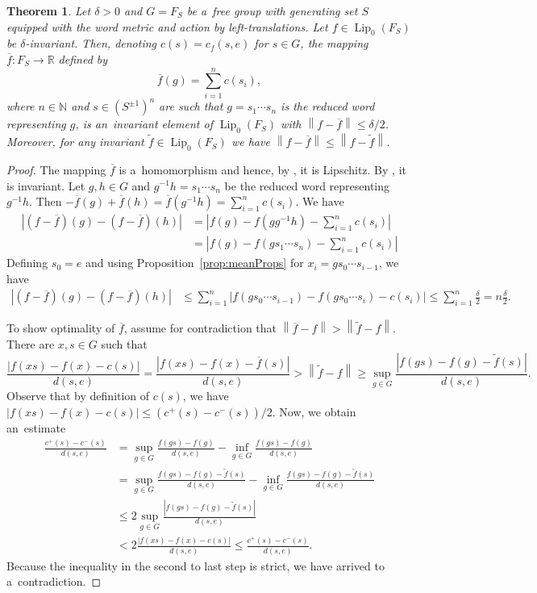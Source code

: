 \documentclass[11pt,a4paper]{amsart}
\newtheorem{theorem}{Theorem}[section]
\theoremstyle{definition}
\newcommand{\R}{\mathbb{R}}
\newcommand{\N}{\mathbb{N}}
\newcommand{\fTilde}{\widetilde{f}}
\newcommand{\fBar}{\overline{f}}
\newcommand{\abs}[1]{\left| #1 \right|}
\newcommand{\norm}[1]{\left\| #1 \right\|}
\newcommand{\Lipz}{\operatorname{Lip}_0}
\begin{document}
	\begin{theorem} \label{thm:KYDfreeWord}
		Let $\delta > 0$ and $G = F_S$ be a~free group with generating set $S$ equipped with the word metric and action by left-translations. Let $f \in \Lipz(F_S)$ be $\delta$-invariant. Then, denoting $c(s) = c_f(s, e)$ for $s \in G$, the mapping $\fBar: F_S \to \R$ defined by
		\begin{equation*}
			\fBar(g) = \sum_{i=1}^n c(s_i),
		\end{equation*}
		where $n \in \N$ and $s \in (S^{\pm1})^n$ are such that $g = s_1 \cdots s_n$ is the reduced word representing $g$, is an~invariant element of $\Lipz(F_S)$ with $\norm{f - \fBar} \leq \delta/2$. Moreover, for any invariant $\fTilde \in \Lipz(F_S)$ we have $\norm{f-\fBar} \leq \norm{f-\fTilde}$.
	\end{theorem}
	\begin{proof}
		The mapping $\fBar$ is a~homomorphism and hence, by , it is Lipschitz. By , it is invariant. Let $g, h \in G$ and $g^{-1}h = s_1\cdots s_n$ be the reduced word representing $g^{-1}h$. Then $-\fBar(g) + \fBar(h) = \fBar(g^{-1}h) = \sum_{i=1}^n c(s_i)$. We have
		\begin{align*}
			\abs{(f-\fBar)(g) - (f-\fBar)(h)}
			&= \abs{f(g) - f(gg^{-1}h) - \sum_{i=1}^n c(s_i)}\\
			&= \abs{f(g) - f(gs_1\cdots s_n) - \sum_{i=1}^n c(s_i)}
		\end{align*}
		Defining $s_0 = e$ and using Proposition~\ref{prop:meanProps} for $x_i = g s_0 \cdots s_{i-1}$, we have
		\begin{align*}
			\abs{(f-\fBar)(g) - (f-\fBar)(h)}
			&\leq \sum_{i=1}^n \abs{f(g s_0 \cdots s_{i-1}) - f(g s_0 \cdots s_{i}) - c(s_i)}
			\leq \sum_{i=1}^n \frac{\delta}{2}
			= n\frac{\delta}{2}.
		\end{align*}
		
		To show optimality of $\fBar$, assume for contradiction that $\norm{\fBar - f} > \norm{\fTilde - f}$. There are $x, s \in G$ such that
		\begin{equation*}
			\frac{\abs{f(xs) - f(x) - c(s)}}{d(s,e)}
			= \frac{\abs{f(xs) - f(x) - \fBar(s)}}{d(s,e)}
			> \norm{\fTilde - f}
			\geq \sup_{g \in G} \frac{\abs{f(gs) - f(g) - \fTilde(s)}}{d(s,e)}.
		\end{equation*}
		Observe that by definition of $c(s)$, we have $\abs{f(xs) - f(x) - c(s)} \leq (c^+(s) - c^-(s))/2$.
		Now, we obtain an~estimate
		\begin{align*}
			\frac{c^+(s) - c^-(s)}{d(s,e)}
			&= \sup_{g \in G} \frac{f(gs) - f(g)}{d(s,e)} - \inf_{g \in G} \frac{f(gs) - f(g)}{d(s,e)}\\
			&= \sup_{g \in G} \frac{f(gs) - f(g) - \fTilde(s)}{d(s,e)} - \inf_{g \in G} \frac{f(gs) - f(g) - \fTilde(s)}{d(s,e)}\\
			&\leq 2\sup_{g \in G} \frac{\abs{f(gs) - f(g) - \fTilde(s)}}{d(s,e)}\\
			&< 2 \frac{\abs{f(xs) - f(x) - c(s)}}{d(s,e)}
			\leq \frac{c^+(s) - c^-(s)}{d(s,e)}.
		\end{align*}
		Because the inequality in the second to last step is strict, we have arrived to a~contradiction.
	\end{proof}
	
\end{document}
